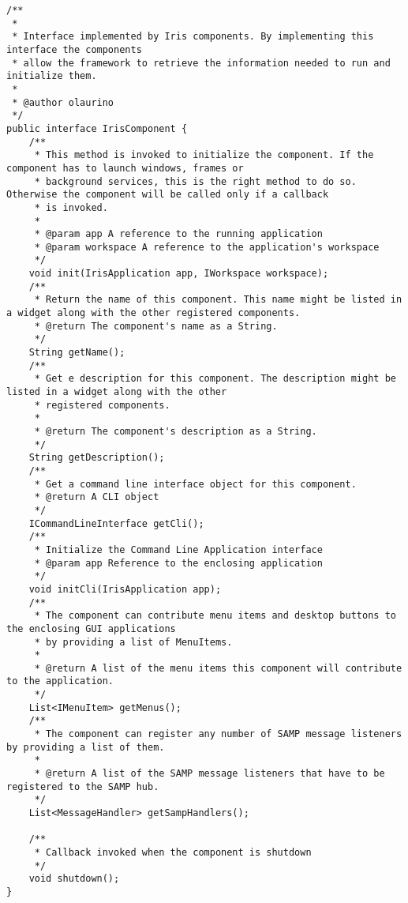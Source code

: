 \begin{verbatim}
/**
 *
 * Interface implemented by Iris components. By implementing this interface the components
 * allow the framework to retrieve the information needed to run and initialize them.
 *
 * @author olaurino
 */
public interface IrisComponent {
    /**
     * This method is invoked to initialize the component. If the component has to launch windows, frames or
     * background services, this is the right method to do so. Otherwise the component will be called only if a callback
     * is invoked.
     *
     * @param app A reference to the running application
     * @param workspace A reference to the application's workspace
     */
    void init(IrisApplication app, IWorkspace workspace);
    /**
     * Return the name of this component. This name might be listed in a widget along with the other registered components.
     * @return The component's name as a String.
     */
    String getName();
    /**
     * Get e description for this component. The description might be listed in a widget along with the other
     * registered components.
     *
     * @return The component's description as a String.
     */
    String getDescription();
    /**
     * Get a command line interface object for this component.
     * @return A CLI object
     */
    ICommandLineInterface getCli();
    /**
     * Initialize the Command Line Application interface
     * @param app Reference to the enclosing application
     */
    void initCli(IrisApplication app);
    /**
     * The component can contribute menu items and desktop buttons to the enclosing GUI applications
     * by providing a list of MenuItems.
     *
     * @return A list of the menu items this component will contribute to the application.
     */
    List<IMenuItem> getMenus();
    /**
     * The component can register any number of SAMP message listeners by providing a list of them.
     *
     * @return A list of the SAMP message listeners that have to be registered to the SAMP hub.
     */
    List<MessageHandler> getSampHandlers();

    /**
     * Callback invoked when the component is shutdown
     */
    void shutdown();
}
\end{verbatim}


